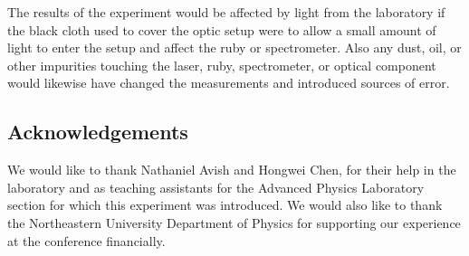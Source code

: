 \documentclass[11pt, a4paper, twocolumn]{article}
\begin{document}
The results of the experiment would be affected by light from the laboratory if the black cloth used to cover the optic setup were to allow a small amount of light to enter the setup and affect the ruby or spectrometer. Also any dust, oil, or other impurities touching the laser, ruby, spectrometer, or optical component would likewise have changed the measurements and introduced sources of error.

\subsection*{Acknowledgements}
We would like to thank Nathaniel Avish and Hongwei Chen, for their help in the laboratory and as teaching assistants for the Advanced Physics Laboratory section for which this experiment was introduced. We would also like to thank the Northeastern University Department of Physics for supporting our experience at the conference financially.

\nocite{*}


\end{document}
